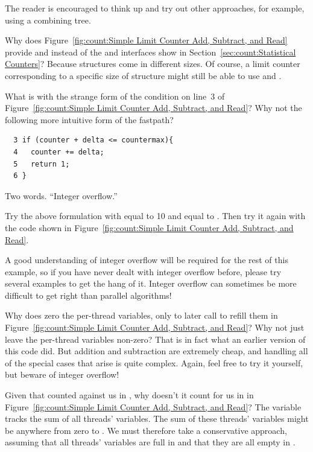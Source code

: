 	The reader is encouraged to think up and try out other approaches,
	for example, using a combining tree.

\QuickQ{}
	Why does
	Figure~\ref{fig:count:Simple Limit Counter Add, Subtract, and Read}
	provide  and  instead of the
	 and  interfaces show in
	Section~\ref{sec:count:Statistical Counters}?
\QuickA{}
	Because structures come in different sizes.
	Of course, a limit counter corresponding to a specific size
	of structure might still be able to use
	 and .

\QuickQ{}
	What is with the strange form of the condition on line~3 of
	Figure~\ref{fig:count:Simple Limit Counter Add, Subtract, and Read}?
	Why not the following more intuitive form of the fastpath?

	\vspace{5pt}
	\begin{minipage}[t]{\columnwidth}
	\small
	\begin{verbatim}
  3 if (counter + delta <= countermax){
  4   counter += delta;
  5   return 1;
  6 }
	\end{verbatim}
	\end{minipage}
	\vspace{5pt}
\QuickA{}
	Two words.
	``Integer overflow.''

	Try the above formulation with  equal to 10 and
	 equal to .
	Then try it again with the code shown in
	Figure~\ref{fig:count:Simple Limit Counter Add, Subtract, and Read}.

	A good understanding of integer overflow will be required for
	the rest of this example, so if you have never dealt with
	integer overflow before, please try several examples to get
	the hang of it.
	Integer overflow can sometimes be more difficult to get right
	than parallel algorithms!

\QuickQ{}
	Why does  zero the per-thread variables,
	only to later call  to refill them in
	Figure~\ref{fig:count:Simple Limit Counter Add, Subtract, and Read}?
	Why not just leave the per-thread variables non-zero?
\QuickA{}
	That is in fact what an earlier version of this code did.
	But addition and subtraction are extremely cheap, and handling
	all of the special cases that arise is quite complex.
	Again, feel free to try it yourself, but beware of integer
	overflow!

\QuickQ{}
	Given that  counted against us in ,
	why doesn't it count for us in  in
	Figure~\ref{fig:count:Simple Limit Counter Add, Subtract, and Read}?
\QuickA{}
	The  variable tracks the sum of all threads'
	 variables.
	The sum of these threads'  variables might be anywhere
	from zero to .
	We must therefore take a conservative approach, assuming that
	all threads'  variables are full in 
	and that they are all empty in .

